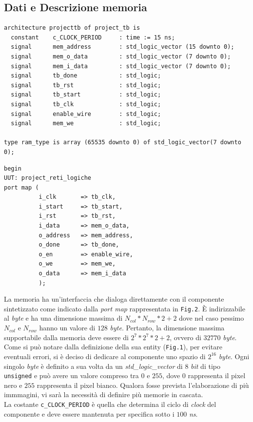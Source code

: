 \documentclass[11pt, a4paper]{article}
\begin{document}
\subsection{Dati e Descrizione memoria}
\begin{lstlisting}[title={Fig.1}]
architecture projecttb of project_tb is
  constant    c_CLOCK_PERIOD     : time := 15 ns;
  signal      mem_address        : std_logic_vector (15 downto 0);
  signal      mem_o_data         : std_logic_vector (7 downto 0);
  signal      mem_i_data         : std_logic_vector (7 downto 0);
  signal      tb_done            : std_logic;
  signal      tb_rst             : std_logic;
  signal      tb_start           : std_logic;
  signal      tb_clk             : std_logic;
  signal      enable_wire        : std_logic;
  signal      mem_we             : std_logic;

type ram_type is array (65535 downto 0) of std_logic_vector(7 downto 0);
\end{lstlisting}
\begin{lstlisting}[title={Fig. 2}]
begin
UUT: project_reti_logiche
port map (
          i_clk       => tb_clk,
          i_start     => tb_start,
          i_rst       => tb_rst,
          i_data      => mem_o_data,
          o_address   => mem_address,
          o_done      => tb_done,
          o_en        => enable_wire,
          o_we        => mem_we,
          o_data      => mem_i_data
          );
\end{lstlisting}
La memoria ha un'interfaccia che dialoga direttamente con il componente sintetizzato come indicato dalla \textit{port map} rappresentata in \texttt{Fig.2}. È indirizzabile al \textit{byte} e ha una dimensione massima di $N_{col}*N_{row}*2+2$ dove nel caso pessimo $N_{col}$ e $N_{row}$ hanno un valore di $128$ \textit{byte}. Pertanto, la dimensione massima supportabile dalla memoria deve essere di $2^7 * 2^7 *2 + 2$, ovvero di $32770$ \textit{byte}. Come si può notare dalla definizione della sua entity (\texttt{Fig.1}), per evitare eventuali errori, si è deciso di dedicare al componente uno spazio di $2^{16}$ \textit{byte}. Ogni singolo \textit{byte} è definito a sua volta da un \textit{std\_logic\_vector} di $8$ \textit{bit} di tipo \texttt{unsigned} e può avere un valore compreso tra $0$ e $255$, dove $0$ rappresenta il pixel nero e $255$ rappresenta il pixel bianco.
Qualora fosse prevista l'elaborazione di più immmagini, vi sarà la necessità di definire più memorie in cascata. \\
La costante \texttt{c\_CLOCK\_PERIOD} è quella che determina il ciclo di \textit{clock} del componente e deve essere mantenuta per specifica sotto i $100$ \textit{ns}.
\pagebreak
\end{document}
